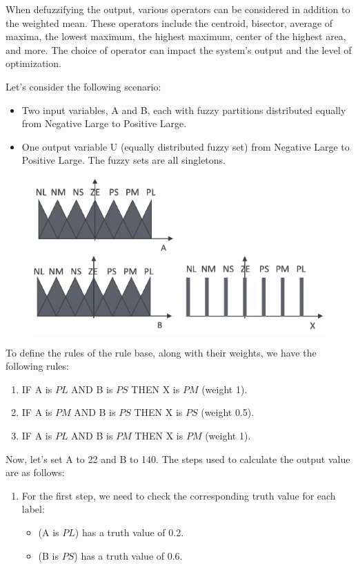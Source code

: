 When defuzzifying the output, various operators can be considered in addition to the weighted mean. 
These operators include the centroid, bisector, average of maxima, the lowest maximum, the highest maximum, center of the highest area, and more. 
The choice of operator can impact the system's output and the level of optimization.
\begin{example}
    Let's consider the following scenario:
    \begin{itemize}
        \item Two input variables, A and B, each with fuzzy partitions distributed equally from Negative Large to Positive Large.
        \item One output variable U (equally distributed fuzzy set) from Negative Large to Positive Large. The fuzzy sets are all singletons.
    \end{itemize} 
    \begin{figure}[H]
        \centering
        \includegraphics[width=0.5\linewidth]{images/rules.png}
    \end{figure}
    To define the rules of the rule base, along with their weights, we have the following rules:
    \begin{enumerate}
        \item IF A is $PL$ AND B is $PS$ THEN X is $PM$ (weight 1).
        \item IF A is $PM$ AND B is $PS$ THEN X is $PS$ (weight 0.5).
        \item IF A is $PL$ AND B is $PM$ THEN X is $PM$ (weight 1).
    \end{enumerate}
    Now, let's set A to 22 and B to 140. 
    The steps used to calculate the output value are as follows:
    \begin{enumerate}
        \item For the first step, we need to check the corresponding truth value for each label:
            \begin{itemize}
                \item (A is $PL$) has a truth value of 0.2.
                \item (B is $PS$) has a truth value of 0.6.

\end{itemize}
\end{enumerate}
\end{example}
